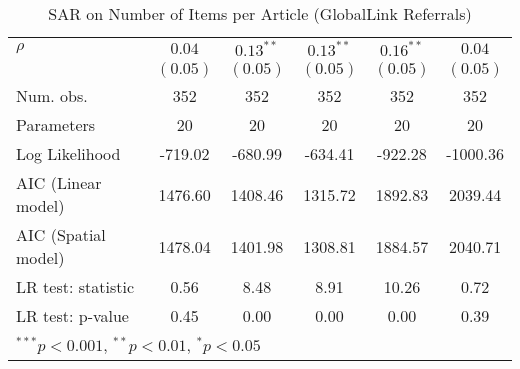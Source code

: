 \begin{table}[!h]
\begin{center}
\begin{tabular}{l c c c c c }
$\rho$                  & $0.04$       & $0.13^{**}$  & $0.13^{**}$  & $0.16^{**}$  & $0.04$       \\
                        & $(0.05)$     & $(0.05)$     & $(0.05)$     & $(0.05)$     & $(0.05)$     \\
\midrule
Num. obs.               & 352          & 352          & 352          & 352          & 352          \\
Parameters              & 20           & 20           & 20           & 20           & 20           \\
Log Likelihood          & -719.02      & -680.99      & -634.41      & -922.28      & -1000.36     \\
AIC (Linear model)      & 1476.60      & 1408.46      & 1315.72      & 1892.83      & 2039.44      \\
AIC (Spatial model)     & 1478.04      & 1401.98      & 1308.81      & 1884.57      & 2040.71      \\
LR test: statistic      & 0.56         & 8.48         & 8.91         & 10.26        & 0.72         \\
LR test: p-value        & 0.45         & 0.00         & 0.00         & 0.00         & 0.39         \\
\bottomrule
\multicolumn{6}{l}{\scriptsize{$^{***}p<0.001$, $^{**}p<0.01$, $^*p<0.05$}}
\end{tabular}
\caption{SAR on Number of Items per Article (GlobalLink Referrals)}
\label{table:coefficients}
\end{center}
\end{table}
